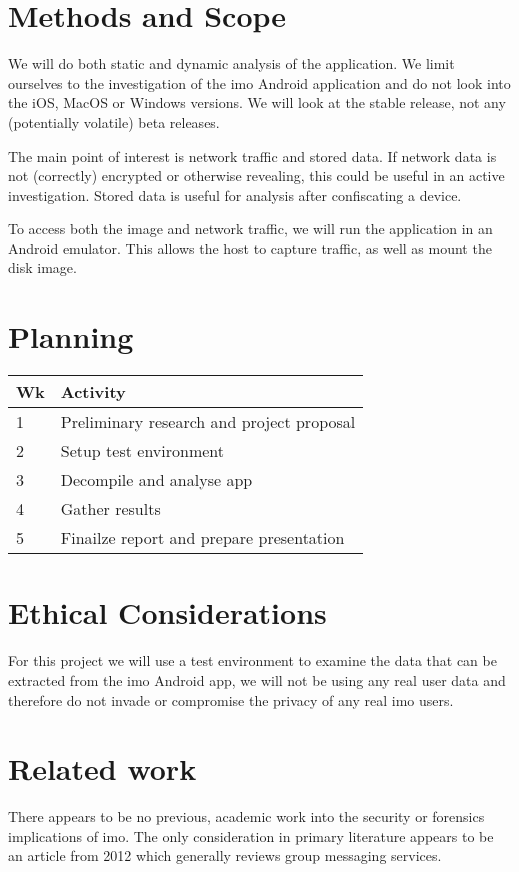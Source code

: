 \documentclass[conference]{IEEEtran}
\begin{document}
\section{Methods and Scope}

We will do both static and dynamic analysis of the application. We limit
ourselves to the investigation of the imo Android application and do not look
into the iOS, MacOS or Windows versions. We will look at the stable release,
not any (potentially volatile) beta releases.

The main point of interest is network traffic and stored data. If network data
is not (correctly) encrypted or otherwise revealing, this could be useful in an
active investigation. Stored data is useful for analysis after confiscating a
device.

To access both the image and network traffic, we will run the application in an
Android emulator. This allows the host to capture traffic, as well as mount the
disk image.


\section{Planning}

\begin{tabular}[H]{ l p{6cm} }
	\toprule
	\textbf{Wk} & \textbf{Activity} \\
	\midrule
	1 & Preliminary research and project proposal\\
	2 & Setup test environment\\
	3 & Decompile and analyse app\\
	4 & Gather results\\
	5 & Finailze report and prepare presentation \\
	\bottomrule
	
	
\end{tabular}


\section{Ethical Considerations}

For this project we will use a test environment to examine the data that can be
extracted from the imo Android app, we will not be using any real user data and
therefore do not invade or compromise the privacy of any real imo users. 


\section{Related work}

There appears to be no previous, academic work into the security or forensics
implications of imo. The only consideration in primary literature appears to be
an article from 2012 which generally reviews group messaging
services\cite{zhu}.


\printbibliography
\end{document}
